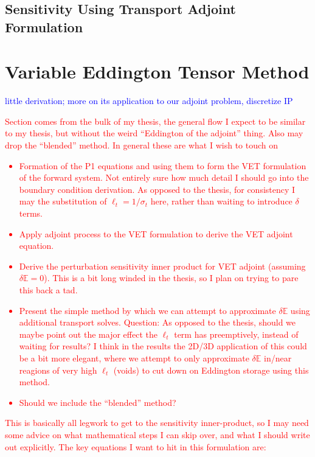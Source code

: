\documentclass[review]{elsarticle}
\newcommand{\Edd}{\mathbb{E}}
\newcommand{\sigt}{\sigma_t}
\newcommand{\isigt}{\ell_t}
\newcommand{\comment}[2]{\marginpar{\textcolor{#2}{$\star$}}\textcolor{#2}{#1}\newline}
\newcommand{\iwh}[1]{\comment{#1}{red}}
\newcommand{\iwh}[1]{\phantom{a}}
\newcommand{\tcb}[1]{\textcolor{blue}{#1}}
\begin{document}
\subsection{Sensitivity Using Transport Adjoint Formulation}

\section{Variable Eddington Tensor Method}
\label{sec:VET}
\tcb{little derivation; more on its application to our adjoint problem, discretize IP}
\iwh{
Section comes from the bulk of my thesis, the general flow I expect to be similar to my thesis, but without the weird ``Eddington of the adjoint'' thing. Also may drop the ``blended'' method. In general these are what I wish to touch on
\begin{itemize}
\item Formation of the P1 equations and using them to form the VET formulation of the forward system. Not entirely sure how much detail I should go into the boundary condition derivation. As opposed to the thesis, for consistency I may the substitution of $\isigt = 1/\sigt$ here, rather than waiting to introduce $\delta$ terms.
\item Apply adjoint process to the VET formulation to derive the VET adjoint equation.
\item Derive the perturbation sensitivity inner product for VET adjoint (assuming $\delta \Edd=0$). This is a bit long winded in the thesis, so I plan on trying to pare this back a tad.
\item Present the simple method by which we can attempt to approximate $\delta \Edd$ using additional transport solves. Question: As opposed to the thesis, should we maybe point out the major effect the $\isigt$ term has preemptively, instead of waiting for results? I think in the results the 2D/3D application of this could be a bit more elegant, where we attempt to only approximate $\delta \Edd$ in/near reagions of very high $\isigt$ (voids) to cut down on Eddington storage using this method.
\item Should we include the ``blended'' method?
\end{itemize}
This is basically all legwork to get to the sensitivity inner-product, so I may need some advice on what mathematical steps I can skip over, and what I should write out explicitly. The key equations I want to hit in this formulation are:
}
\end{document}
